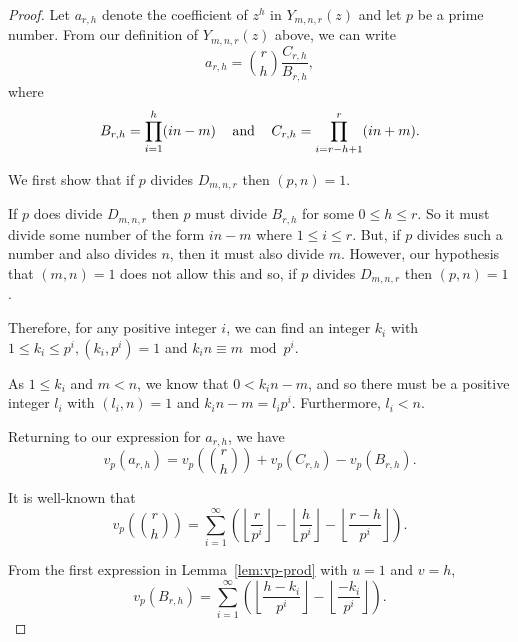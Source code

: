 \documentclass{jT}
\theoremstyle{definition}
\begin{document}
\begin{proof}
Let $a_{r,h}$ denote the coefficient of $z^{h}$ in 
$Y_{m,n,r}(z)$ and let $p$ be a prime number. From our 
definition of $Y_{m,n,r}(z)$ above, we can write 
\begin{displaymath}
a_{r,h} = {r \choose h} \frac{C_{r,h}}{B_{r,h}},
\end{displaymath}
where 
\begin{displaymath}
B_{r,h} = \prod_{i=1}^{h} (in-m) 
\hspace{3.0mm} \mbox{ and } \hspace{3.0mm}
C_{r,h} = \prod_{i=r-h+1}^{r} (in+m).  
\end{displaymath}

We first show that if $p$ divides $D_{m,n,r}$ then $(p,n)=1$. 

If $p$ does divide $D_{m,n,r}$ then $p$ must divide $B_{r,h}$
for some $0 \leq h \leq r$. So it must divide some number of the
form $in-m$ where $1 \leq i \leq r$. But, if $p$ divides such a
number and also divides $n$, then it must also divide $m$. However, 
our hypothesis that $(m,n)=1$ does not allow this and so,  
if $p$ divides $D_{m,n,r}$ then $(p,n)=1$. 

Therefore, for any positive integer $i$, we can find an integer $k_{i}$ with
$1 \leq k_{i} \leq p^{i}, (k_{i},p^{i})=1$ and  $k_{i}n \equiv m \bmod p^{i}$.

As $1 \leq k_{i}$ and $m<n$, we know that $0 < k_{i}n-m$, and so there
must be a positive integer $l_{i}$ with $(l_{i},n)=1$ and $k_{i}n-m=l_{i}p^{i}$.
Furthermore, $l_{i} < n$.

Returning to our expression for $a_{r,h}$, we have 
\begin{displaymath}
v_{p} \left( a_{r,h} \right)
= v_{p} \left( {r \choose h} \right) + v_{p} \left( C_{r,h} \right)
- v_{p} \left( B_{r,h} \right).
\end{displaymath}

It is well-known that
\begin{displaymath}
v_{p} \left( {r \choose h} \right) 
= \sum_{i=1}^{\infty} 
  \left( \left\lfloor \frac{r}{p^{i}} \right\rfloor
         - \left\lfloor \frac{h}{p^{i}} \right\rfloor
         - \left\lfloor \frac{r-h}{p^{i}} \right\rfloor \right).
\end{displaymath}

From the first expression in Lemma~\ref{lem:vp-prod} with $u=1$ and $v=h$,
\begin{displaymath}
v_{p} \left( B_{r,h} \right) 
= \sum_{i=1}^{\infty} 
  \left( \left\lfloor \frac{h-k_{i}}{p^{i}} \right\rfloor
         - \left\lfloor \frac{-k_{i}}{p^{i}} \right\rfloor \right).
\end{displaymath}


\end{proof}
\end{document}
